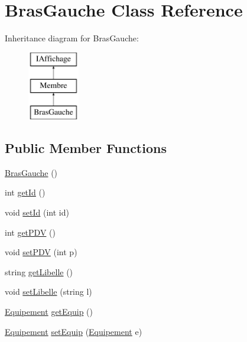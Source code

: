 \hypertarget{class_bras_gauche}{\section{\-Bras\-Gauche \-Class \-Reference}
\label{class_bras_gauche}
}
\-Inheritance diagram for \-Bras\-Gauche\-:\begin{figure}[H]
\begin{center}
\leavevmode
\includegraphics[height=3.000000cm]{class_bras_gauche}
\end{center}
\end{figure}
\subsection*{\-Public \-Member \-Functions}
\begin{DoxyCompactItemize}
\item 
\hyperlink{class_bras_gauche_a853b7a5ea4ad2126c031e5997b2066e0}{\-Bras\-Gauche} ()
\item 
int \hyperlink{class_bras_gauche_ad30956e6d1afe81c57ed5545bfe7b0e6}{get\-Id} ()
\item 
void \hyperlink{class_bras_gauche_a0e1accaf25773a48d64f716a6389c33c}{set\-Id} (int id)
\item 
int \hyperlink{class_bras_gauche_a24954e20008bc8724156731b5450b91f}{get\-P\-D\-V} ()
\item 
void \hyperlink{class_bras_gauche_ac5698d46c3af46fcaaf9a6cd5cd3d495}{set\-P\-D\-V} (int p)
\item 
string \hyperlink{class_bras_gauche_a0c22b277eae6cf0a0475f02f5037db1f}{get\-Libelle} ()
\item 
void \hyperlink{class_bras_gauche_a64e26bbb9af48a13f9c4b128ddb74570}{set\-Libelle} (string l)
\item 
\hyperlink{class_equipement}{\-Equipement} \hyperlink{class_bras_gauche_abc90f6e5e9d8fb71f5b7c76cc51d8e48}{get\-Equip} ()
\item 
\hyperlink{class_equipement}{\-Equipement} \hyperlink{class_bras_gauche_ad99fefc88e948e61c781a76b4262102b}{set\-Equip} (\hyperlink{class_equipement}{\-Equipement} e)
\end{DoxyCompactItemize}


